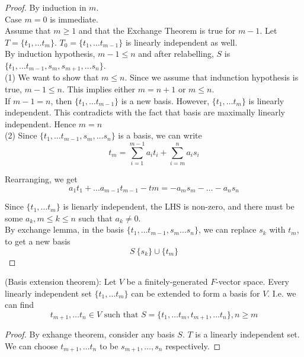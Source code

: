 \begin{proof}

By induction in $m$. \\

Case $m=0$ is immediate. \\

Assume that $m \geq 1$ and that the Exchange Theorem is true for $m - 1$. Let $T = \{ t_1, \hdots t_m \}$. $T_0 = \{ t_1, \hdots t_{m - 1} \} $ is linearly independent as well. \\

By induction hypothesis, $m - 1 \leq n$ and after relabelling, $S$ is $\{  t_1, \hdots t_{m - 1}, s_m, s_{m + 1}, \hdots s_n \} $.  \\

(1) We want to show that $m \leq n$. Since we assume that indunction hypothesis is true, $m -1 \leq n$. This implies either $m = n + 1$ or $m \leq n$. \\

If $m - 1 = n$, then $\{ t_1, \hdots t_{m - 1} \} $ is a new basis. However, $\{ t_1, \hdots t_m \}$ is linearly independent. This contradicts with the fact that basis are maximally linearly independent. Hence $m = n$ \\

(2) Since $ \{ t_1, \hdots t_{m - 1}, s_m, \hdots s_n \} $ is a basis, we can write 
\[
t_m = \sum\limits_{i = 1}^{m - 1}  a_i t_i + \sum\limits_{i = m}^{n}  a_i s_i
\]

Rearranging, we get 
\[
  a_1 t_1 + \hdots a_{m - 1}t_{m- 1} - tm = -a_m s_m - \hdots  - a_n s_n
\]

Since $ \{ t_1, \hdots t_m \} $ is lienarly independent, the LHS is non-zero, and there must be some $a_k, m \leq k \leq n$  such that $a_k \neq 0$. \\

By exchange lemma, in the basis $\{ t_1, \hdots t_{m - 1}, s_m \hdots s_n \} $, we can replace $s_k$ with $t_m$, to get a new basis
\[
  S \ \{ s_k \}  \cup \{ t_m \} 
\]
\end{proof}

\begin{corollary}
(Basis extension theorem): Let $V$ be a finitely-generated $F$-vector space. Every linearly independent set $\{ t_1, \hdots t_m \} $ can be extended to form a basis for $V$. I.e. we can find 
    \[
      t_{m + 1}, \hdots t_n \in V \text{ such that } S = \{ t_1, \hdots t_m, t_{m + 1}, \hdots t_n \}, n \geq m
    \]
\end{corollary} 

\begin{proof}
By exhange theorem, consider any basis $S$. $T$ is a linearly independent set. We can choose $t_{m+1}, \hdots t_n$ to be $s_{m + 1}, \hdots, s_n $ respectively. 
\end{proof}

\newpage





















